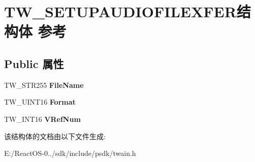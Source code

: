 \hypertarget{struct_t_w___s_e_t_u_p_a_u_d_i_o_f_i_l_e_x_f_e_r}{}\section{T\+W\+\_\+\+S\+E\+T\+U\+P\+A\+U\+D\+I\+O\+F\+I\+L\+E\+X\+F\+E\+R结构体 参考}
\label{struct_t_w___s_e_t_u_p_a_u_d_i_o_f_i_l_e_x_f_e_r}
\subsection*{Public 属性}
\begin{DoxyCompactItemize}
\item 
\mbox{\label{struct_t_w___s_e_t_u_p_a_u_d_i_o_f_i_l_e_x_f_e_r_acb29ba3cf7fed43dae529344efee716e}} 
T\+W\+\_\+\+S\+T\+R255 {\bfseries File\+Name}
\item 
\mbox{\label{struct_t_w___s_e_t_u_p_a_u_d_i_o_f_i_l_e_x_f_e_r_ab659f126c99abcbbc6ba201bca63ef42}} 
T\+W\+\_\+\+U\+I\+N\+T16 {\bfseries Format}
\item 
\mbox{\label{struct_t_w___s_e_t_u_p_a_u_d_i_o_f_i_l_e_x_f_e_r_aee6ff40bd2ecb7f833f3dd26ba9f9813}} 
T\+W\+\_\+\+I\+N\+T16 {\bfseries V\+Ref\+Num}
\end{DoxyCompactItemize}


该结构体的文档由以下文件生成\+:\begin{DoxyCompactItemize}
\item 
E\+:/\+React\+O\+S-\/0../sdk/include/psdk/twain.\+h\end{DoxyCompactItemize}
